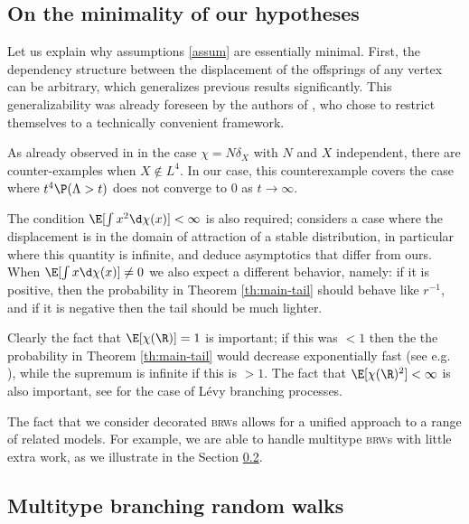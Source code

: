 \documentclass[10pt,a4paper]{article}
\newcommand{\brws}{\textsc{brw}s\xspace}
\begin{document}
\subsection{On the minimality of our hypotheses}
\label{sec:minimality}

Let us explain why assumptions \ref{assum} are essentially minimal. First, the dependency structure between the displacement of the offsprings of any vertex can be arbitrary, which generalizes previous results \cite{lalley2015maximal} significantly. This generalizability was already foreseen by the authors of \cite{lalley2015maximal}, who %
chose to restrict themselves to a technically convenient framework. 

As already observed in \cite{lalley2015maximal} in the case $\chi = N \delta_X$ with $N$ and $X$ independent, there are counter-examples when $X \notin L^4$. In our case, this counterexample covers the case where $t^4\P(\Lambda>t)$ does not converge to $0$ as $t\to\infty$. 

The condition $\E[\int x^2 \d\chi(x)] < \infty$ is also required; \cite{lalley2016maximalstable} considers a case where the displacement is in the domain of attraction of a stable distribution, in particular where this quantity is infinite, and deduce asymptotics that differ from ours. When $\E[\int x \d\chi(x)] \neq 0$ we also expect a different behavior, namely: if it is positive, then the probability in Theorem \ref{th:main-tail} should behave like $r^{-1}$, and if it is negative then the tail should be much lighter. 

Clearly the fact that $\E[\chi(\R)]=1$ is important; if this was $<1$ then the the probability in Theorem \ref{th:main-tail} would decrease exponentially fast (see e.g. \cite{hou2025maximal}), while the supremum is infinite if this is $>1$. The fact that $\E[\chi(\R)^2] <\infty$ is also important, see \cite{hou2025tail} for the case of Lévy branching processes.

The fact that we consider decorated \brws allows for a unified approach to a range of related models. For example, we are able to handle multitype \brws with little extra work, as we illustrate in the Section \ref{sec:extensions}.








\subsection{Multitype branching random walks}
\label{sec:extensions}
\end{document}
